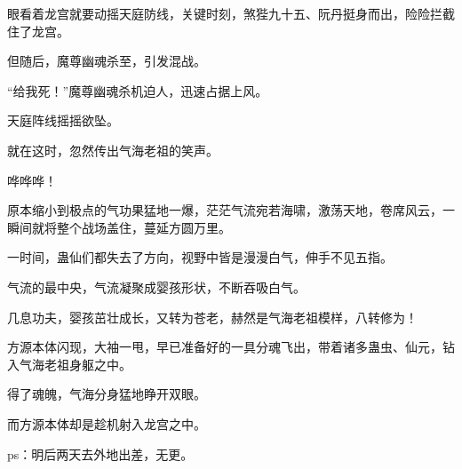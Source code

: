 \begin{this_body}
眼看着龙宫就要动摇天庭防线，关键时刻，煞狴九十五、阮丹挺身而出，险险拦截住了龙宫。

但随后，魔尊幽魂杀至，引发混战。

“给我死！”魔尊幽魂杀机迫人，迅速占据上风。

天庭阵线摇摇欲坠。

就在这时，忽然传出气海老祖的笑声。

哗哗哗！

原本缩小到极点的气功果猛地一爆，茫茫气流宛若海啸，激荡天地，卷席风云，一瞬间就将整个战场盖住，蔓延方圆万里。

一时间，蛊仙们都失去了方向，视野中皆是漫漫白气，伸手不见五指。

气流的最中央，气流凝聚成婴孩形状，不断吞吸白气。

几息功夫，婴孩茁壮成长，又转为苍老，赫然是气海老祖模样，八转修为！

方源本体闪现，大袖一甩，早已准备好的一具分魂飞出，带着诸多蛊虫、仙元，钻入气海老祖身躯之中。

得了魂魄，气海分身猛地睁开双眼。

而方源本体却是趁机射入龙宫之中。

ps：明后两天去外地出差，无更。

\end{this_body}


